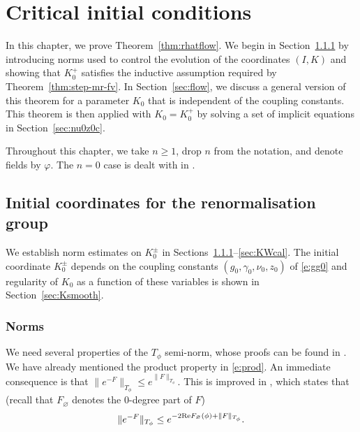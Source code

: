 \chapter{Critical initial conditions}
\label{sec:RGflow}

In this chapter, we prove Theorem~\ref{thm:rhatflow}. We begin in
Section~\ref{sec:norms} by introducing
norms used to control the evolution of the coordinates $(I, K)$ and showing
that $K^+_0$ satisfies the inductive assumption required by
Theorem~\ref{thm:step-mr-fv}. In Section~\ref{sec:flow}, we discuss a general
version of this theorem for a parameter $K_0$ that is independent of the
coupling constants. This theorem is then applied with $K_0 = K^+_0$ by solving
a set of implicit equations in Section~\ref{sec:nu0z0c}.

Throughout this chapter, we take $n \ge 1$, drop $n$ from the notation, and
denote fields by $\varphi$. The $n = 0$ case is dealt with in \cite{BSW-saw-sa}.


\section{Initial coordinates for the renormalisation group}
\label{sec:K0bd}

We establish norm estimates on $K^{\pm}_0$ in Sections~\ref{sec:norms}--\ref{sec:KWcal}.
The initial coordinate $K^{\pm}_0$ depends on the coupling constants
$(g_0, \gamma_0, \nu_0, z_0)$ of \eqref{e:gg0} and regularity of $K_0$ as a
function of these variables is shown in Section~\ref{sec:Ksmooth}.


\subsection{Norms}
\label{sec:norms}

We need several properties of the $T_\phi$ semi-norm, whose proofs can be found in
\cite{BS-rg-norm}. We have already mentioned the product property in \eqref{e:prod}.
An immediate consequence is that $\|e^{-F}\|_{T_\phi} \leq e^{\|F\|_{T_\phi}}$.
This is improved in \cite[Proposition~\ref{norm-prop:eK}]{BS-rg-norm},
which states that (recall that $F_\varnothing$ denotes the $0$-degree part of $F$)
\begin{equation}
\label{e:eK}
\|e^{-F}\|_{T_\phi} \leq e^{-2 {\rm Re} F_\varnothing(\phi) + \|F\|_{T_\phi}}.
\end{equation}

